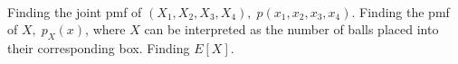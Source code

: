\documentclass{mthe353answer}
\begin{document}
  \begin{questions}
    \setcounter{question}{2}
    \question{}\
    \begin{subparts}
      \subpart{}
      Finding the joint pmf of \((X_1, X_2, X_3, X_4),\; p(x_1, x_2, x_3, x_4)\).
      \subpart{}
      Finding the pmf of \(X,\; p_X(x)\), where \(X\) can be interpreted as the
      number of balls placed into their corresponding box.
      \subpart{}
      Finding \(E[X]\).
    \end{subparts}
  \end{questions}
\end{document}
